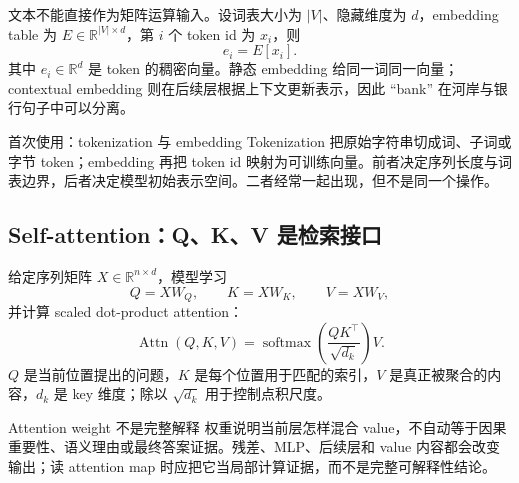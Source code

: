 文本不能直接作为矩阵运算输入。设词表大小为 $|V|$、隐藏维度为 $d$，embedding table 为 $E\in\mathbb{R}^{|V|\times d}$，第 $i$ 个 token id 为 $x_i$，则
\[
e_i=E[x_i].
\]
其中 $e_i\in\mathbb{R}^{d}$ 是 token 的稠密向量。静态 embedding 给同一词同一向量；contextual embedding 则在后续层根据上下文更新表示，因此 ``bank'' 在河岸与银行句子中可以分离。




\begin{knowledgebox}{首次使用：tokenization 与 embedding}
Tokenization 把原始字符串切成词、子词或字节 token；embedding 再把 token id 映射为可训练向量。前者决定序列长度与词表边界，后者决定模型初始表示空间。二者经常一起出现，但不是同一个操作。
\end{knowledgebox}

\subsection{Self-attention：Q、K、V 是检索接口}

给定序列矩阵 $X\in\mathbb{R}^{n\times d}$，模型学习
\[
Q=XW_Q,\qquad K=XW_K,\qquad V=XW_V,
\]
并计算 scaled dot-product attention：
\[
\operatorname{Attn}(Q,K,V)=\operatorname{softmax}\!\left(\frac{QK^{\top}}{\sqrt{d_k}}\right)V.
\]
$Q$ 是当前位置提出的问题，$K$ 是每个位置用于匹配的索引，$V$ 是真正被聚合的内容，$d_k$ 是 key 维度；除以 $\sqrt{d_k}$ 用于控制点积尺度。






\begin{warningbox}{Attention weight 不是完整解释}
权重说明当前层怎样混合 value，不自动等于因果重要性、语义理由或最终答案证据。残差、MLP、后续层和 value 内容都会改变输出；读 attention map 时应把它当局部计算证据，而不是完整可解释性结论。
\end{warningbox}


